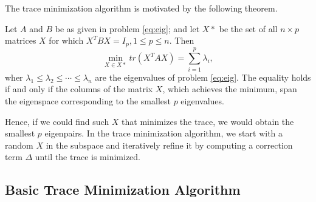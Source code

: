 \label{sec:algorithms}
The trace minimization algorithm is motivated by the following theorem.
\begin{theorem}
	Let $A$ and $B$ be as given in problem \ref{eq:eig}; and let $X*$ be the set of all $n \times p$ matrices $X$ for
	which $X^T B X = I_p, 1 \le p \le n$. Then
	\begin{equation}
		\min_{X \in X*} tr(X^T A X) = \sum_{i=1}^p \lambda_i,
	\end{equation}
	wher $\lambda_1 \le \lambda_2 \le \cdots \le \lambda_n$ are the eigenvalues of problem \ref{eq:eig}. The equality
	holds if and only if the columns of the matrix $X$, which achieves the minimum, span the eigenspace corresponding
	to the smallest $p$ eigenvalues.
\end{theorem}
Hence, if we could find such $X$ that minimizes the trace, we would obtain the smallest $p$ eigenpairs. In the
trace minimization algorithm, we start with a random $X$ in the subspace and iteratively refine it by computing a
correction term $\Delta$ until the trace is minimized.

\subsection{Basic Trace Minimization Algorithm}

